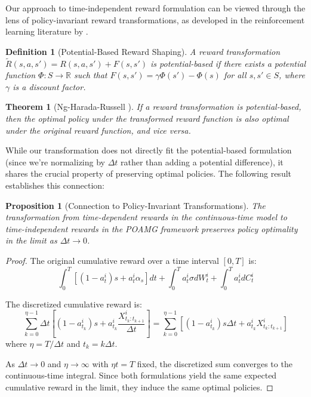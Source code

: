 \documentclass[a4paper,12pt]{report}
\newtheorem{theorem}{Theorem}
\newtheorem{proposition}{Proposition}
\newtheorem{definition}{Definition}
\begin{document}
Our approach to time-independent reward formulation can be viewed through the lens of policy-invariant reward transformations, as developed in the reinforcement learning literature by \citet{ng1999policy}.

\begin{definition}[Potential-Based Reward Shaping]
    A reward transformation $\tilde{R}(s, a, s') = R(s, a, s') + F(s, s')$ is potential-based if there exists a potential function $\Phi: S \to \mathbb{R}$ such that $F(s, s') = \gamma\Phi(s') - \Phi(s)$ for all $s, s' \in S$, where $\gamma$ is a discount factor.
\end{definition}

\begin{theorem}[Ng-Harada-Russell \citep{ng1999policy}]
    If a reward transformation is potential-based, then the optimal policy under the transformed reward function is also optimal under the original reward function, and vice versa.
\end{theorem}

While our transformation does not directly fit the potential-based formulation (since we're normalizing by $\Delta t$ rather than adding a potential difference), it shares the crucial property of preserving optimal policies. The following result establishes this connection:

\begin{proposition}[Connection to Policy-Invariant Transformations]
    The transformation from time-dependent rewards in the continuous-time model to time-independent rewards in the POAMG framework preserves policy optimality in the limit as $\Delta t \to 0$.
\end{proposition}

\begin{proof}
    The original cumulative reward over a time interval $[0, T]$ is:
    \begin{equation}
        \int_0^T [(1-a^i_t)s + a^i_t\alpha_s] dt + \int_0^T a^i_t \sigma dW^i_t + \int_0^T a^i_t dC^i_t
    \end{equation}

    The discretized cumulative reward is:
    \begin{equation}
        \sum_{k=0}^{\eta-1} \Delta t \left[(1-a^i_{t_k})s + a^i_{t_k}\frac{X^i_{t_k:t_{k+1}}}{\Delta t}\right] = \sum_{k=0}^{\eta-1} [(1-a^i_{t_k})s\Delta t + a^i_{t_k}X^i_{t_k:t_{k+1}}]
    \end{equation}
    where $\eta = T/\Delta t$ and $t_k = k\Delta t$.

    As $\Delta t \to 0$ and $\eta \to \infty$ with $\eta t = T$ fixed, the discretized sum converges to the continuous-time integral. Since both formulations yield the same expected cumulative reward in the limit, they induce the same optimal policies.
\end{proof}
\end{document}
